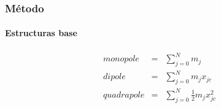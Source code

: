\begin{frame}
    \frametitle{Método}
    \framesubtitle{Estructuras base}

    \begin{eqnarray}
        monopole &=& \sum_{j=0}^{N} m_{j} \nonumber \\
        dipole  &=& \sum_{j=0}^{N} m_{j} x_{jc} \nonumber \\
        quadrapole   &=& \sum_{j=0}^{N} \frac{1}{2} m_{j} x^{2}_{jc} \nonumber 
    \end{eqnarray}

\end{frame}
